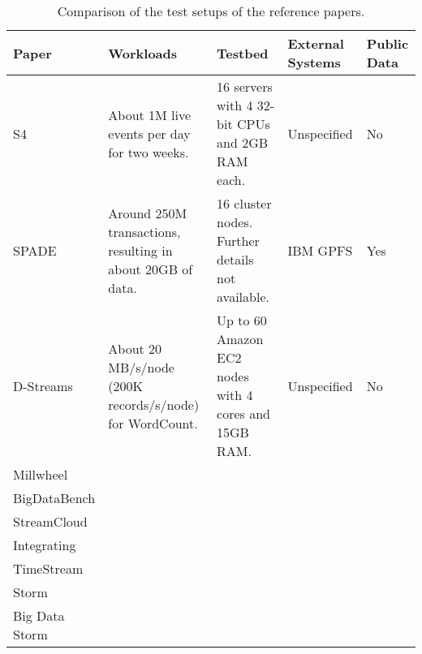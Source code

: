 \begin{table}[H]
  \centering
  {
    \scriptsize
    \hspace*{-1.5cm}
    \begin{tabularx}{0.85\pagewidth}{|l|X|X|l|l|}
      \hline
      Paper & Workloads & Testbed & External Systems & Public Data
      \\\hline
      
      S4\cite{s4}
      & About 1M live events per day for two weeks.
      & 16 servers with 4 32-bit CPUs and 2GB RAM each.
      & Unspecified
      & No
      \\\hline
      
      SPADE\cite{spade}
      & Around 250M transactions, resulting in about 20GB of data.
      & 16 cluster nodes. Further details not available.
      & IBM GPFS
      & Yes\footnotemark
      \\\hline

      D-Streams\cite{discretized}
      & About 20 MB/s/node (200K records/s/node) for WordCount.
      & Up to 60 Amazon EC2 nodes with 4 cores and 15GB RAM.
      & Unspecified
      & No
      \\\hline

      Millwheel\cite{millwheel}
      &
      &
      &
      &
      \\\hline

      BigDataBench\cite{bigdatabench}
      &
      &
      &
      &
      \\\hline

      StreamCloud\cite{streamcloud}
      &
      &
      &
      &
      \\\hline

      Integrating\cite{integrating}
      &
      &
      &
      &
      \\\hline

      TimeStream\cite{timestream}
      &
      &
      &
      &
      \\\hline

      Storm\cite{storm}
      &
      &
      &
      &
      \\\hline

      Big Data Storm\cite{storm2}
      &
      &
      &
      &
      \\\hline
    \end{tabularx}
  }
  \caption{Comparison of the test setups of the reference papers.}
\end{table}

